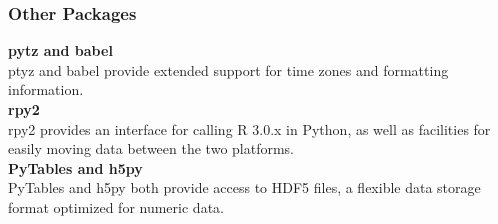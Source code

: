 \documentclass[MASTER.tex]{subfiles}
\begin{document}
\begin{frame}
\frametitle{Other Packages}
\large
\textbf{pytz and babel}\\
ptyz and babel provide extended support for time zones and formatting information.\\ \bigskip
\textbf{rpy2 }\\
rpy2 provides an interface for calling R 3.0.x in Python, as well as facilities for easily moving data between
the two platforms.\\ \bigskip
\textbf{PyTables and h5py }\\
PyTables and h5py both provide access to HDF5 files, a flexible data storage format optimized for numeric
data.
\end{frame}
\end{document}
